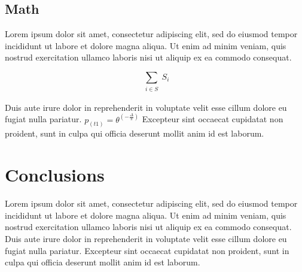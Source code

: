 \documentclass[12pt, a4paper]{article} %
\begin{document}
\subsection{Math}


Lorem ipsum dolor sit amet, consectetur adipiscing elit, sed do eiusmod tempor incididunt ut labore et dolore magna aliqua. Ut enim ad minim veniam, quis nostrud exercitation ullamco laboris nisi ut aliquip ex ea commodo consequat. 

\begin{equation} %
 \sum_{\substack{ %
		 i \in S}}
	S_i
\end{equation} %

Duis aute irure dolor in reprehenderit in voluptate velit esse cillum dolore eu fugiat nulla pariatur. \(p_(t1)=\theta^(-\frac{\Delta}{s})\) %
Excepteur sint occaecat cupidatat non proident, sunt in culpa qui officia deserunt mollit anim id est laborum.

\section{Conclusions}

Lorem ipsum dolor sit amet, consectetur adipiscing elit, sed do eiusmod tempor incididunt ut labore et dolore magna aliqua. Ut enim ad minim veniam, quis nostrud exercitation ullamco laboris nisi ut aliquip ex ea commodo consequat. Duis aute irure dolor in reprehenderit in voluptate velit esse cillum dolore eu fugiat nulla pariatur. Excepteur sint occaecat cupidatat non proident, sunt in culpa qui officia deserunt mollit anim id est laborum.




\newpage

\end{document}

